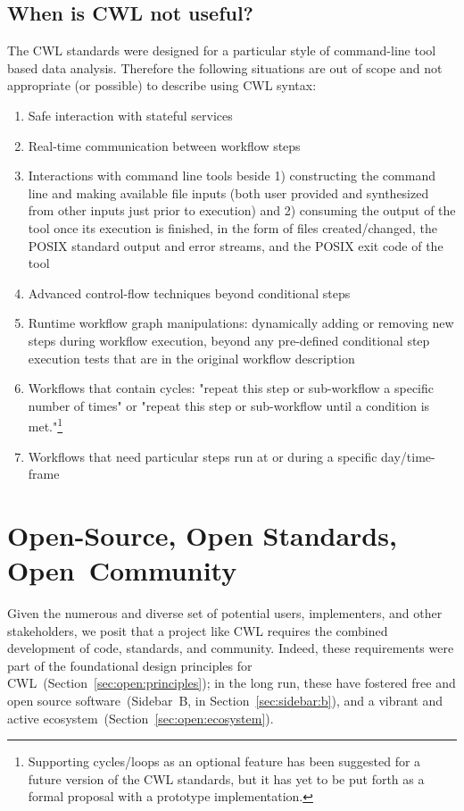 \documentclass[sigconf,revew,screen,timestamp,nonacm]{acmart}
\newcommand{\addition}[1]{{\color{brown} #1}}
\newcommand{\todortwo}[1]{\todo[linecolor=white,color=KamPurple!40]{R2.#1}}
\begin{document}
\addition{
\subsection{When is CWL not useful?} \label{sec:limitations}
\todortwo{1}The CWL standards were designed for a particular style of command-line tool based data analysis. Therefore the following situations are out of scope and not appropriate (or possible) to describe using CWL syntax:

\begin{enumerate}
\item Safe interaction with stateful services
\item Real-time communication between workflow steps
\item Interactions with command line tools beside 1) constructing the command line and making available file inputs (both user provided and synthesized from other inputs just prior to execution) and 2) consuming the output of the tool once its execution is finished, in the form of files created/changed, the POSIX standard output and error streams, and the POSIX exit code of the tool
\item Advanced control-flow techniques beyond conditional steps
\item Runtime workflow graph manipulations: dynamically adding or removing new steps during workflow execution, beyond any pre-defined conditional step execution tests that are in the original workflow description
\item Workflows that contain cycles: "repeat this step or sub-workflow a specific number of times" or "repeat this step or sub-workflow until a condition is met."\footnote{Supporting cycles/loops as an optional feature has been suggested for a future version of the CWL standards, but it has yet to be put forth as a formal proposal with a prototype implementation.}
\item Workflows that need particular steps run at or during a specific day/time-frame
\end{enumerate}
}

\section{Open-Source, Open Standards, Open~Community} \label{sec:open}

Given the numerous and diverse set of potential users, implementers, and other stakeholders, we posit that a project like CWL requires \addition{the} combined development of code, standards, and community. Indeed, these requirements were part of the foundational design principles for CWL~(Section~\ref{sec:open:principles}); in the long run, these have fostered free and open source software~(Sidebar~B, in Section~\ref{sec:sidebar:b}), and a vibrant and active ecosystem~(Section~\ref{sec:open:ecosystem}). 
\end{document}
